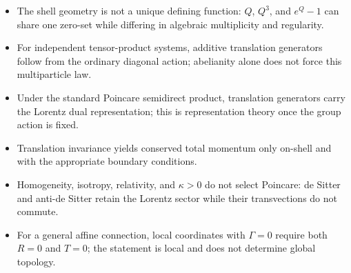 \documentclass[11pt,a4paper]{article}
\begin{document}
\begin{itemize}
\item The shell geometry is not a unique defining function: $Q$, $Q^3$, and $e^Q-1$ can share one zero-set while differing in algebraic multiplicity and regularity.
\item For independent tensor-product systems, additive translation generators follow from the ordinary diagonal action; abelianity alone does not force this multiparticle law.
\item Under the standard Poincare semidirect product, translation generators carry the Lorentz dual representation; this is representation theory once the group action is fixed.
\item Translation invariance yields conserved total momentum only on-shell and with the appropriate boundary conditions.
\item Homogeneity, isotropy, relativity, and $\kappa>0$ do not select Poincare: de Sitter and anti-de Sitter retain the Lorentz sector while their transvections do not commute.
\item For a general affine connection, local coordinates with $\Gamma=0$ require both $R=0$ and $T=0$; the statement is local and does not determine global topology.


\end{itemize}
\end{document}
